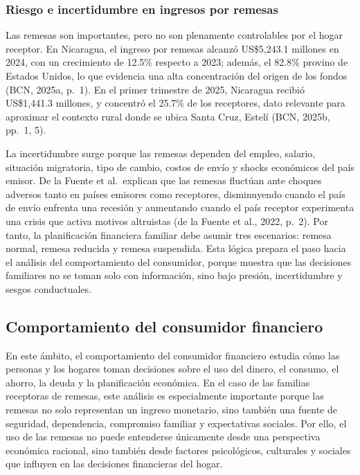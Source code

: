 \documentclass[12pt,letterpaper]{article}
\begin{document}
\subsubsection{\texorpdfstring{\textbf{Riesgo e incertidumbre en ingresos por remesas}}{Riesgo e incertidumbre en ingresos por remesas}}\label{riesgo-e-incertidumbre-en-ingresos-por-remesas}

Las remesas son importantes, pero no son plenamente controlables por el hogar receptor. En Nicaragua, el ingreso por remesas alcanzó US\$5,243.1 millones en 2024, con un crecimiento de 12.5\% respecto a 2023; además, el 82.8\% provino de Estados Unidos, lo que evidencia una alta concentración del origen de los fondos (BCN, 2025a, p.~1). En el primer trimestre de 2025, Nicaragua recibió US\$1,441.3 millones, y concentró el 25.7\% de los receptores, dato relevante para aproximar el contexto rural donde se ubica Santa Cruz, Estelí (BCN, 2025b, pp.~1, 5).

La incertidumbre surge porque las remesas dependen del empleo, salario, situación migratoria, tipo de cambio, costos de envío y shocks económicos del país emisor. De la Fuente et al.~explican que las remesas fluctúan ante choques adversos tanto en países emisores como receptores, disminuyendo cuando el país de envío enfrenta una recesión y aumentando cuando el país receptor experimenta una crisis que activa motivos altruistas (de la Fuente et al., 2022, p.~2). Por tanto, la planificación financiera familiar debe asumir tres escenarios: remesa normal, remesa reducida y remesa suspendida. Esta lógica prepara el paso hacia el análisis del comportamiento del consumidor, porque muestra que las decisiones familiares no se toman solo con información, sino bajo presión, incertidumbre y sesgos conductuales.

\subsection{\texorpdfstring{\textbf{Comportamiento del consumidor financiero}}{Comportamiento del consumidor financiero}}\label{comportamiento-del-consumidor-financiero}

En este ámbito, el comportamiento del consumidor financiero estudia cómo las personas y los hogares toman decisiones sobre el uso del dinero, el consumo, el ahorro, la deuda y la planificación económica. En el caso de las familias receptoras de remesas, este análisis es especialmente importante porque las remesas no solo representan un ingreso monetario, sino también una fuente de seguridad, dependencia, compromiso familiar y expectativas sociales. Por ello, el uso de las remesas no puede entenderse únicamente desde una perspectiva económica racional, sino también desde factores psicológicos, culturales y sociales que influyen en las decisiones financieras del hogar.
\end{document}
